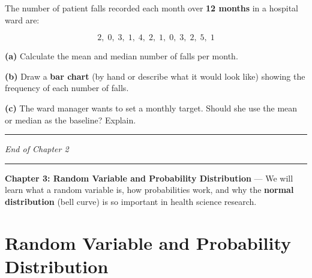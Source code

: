 \documentclass[
  12pt,
  letterpaper,
]{book}
\begin{document}
\begin{tcolorbox}[enhanced jigsaw, arc=.35mm, bottomrule=.15mm, bottomtitle=1mm, breakable, colback=white, colbacktitle=quarto-callout-caution-color!10!white, colframe=quarto-callout-caution-color-frame, coltitle=black, left=2mm, leftrule=.75mm, opacityback=0, opacitybacktitle=0.6, rightrule=.15mm, title={✏️ Exercise 3}, titlerule=0mm, toprule=.15mm, toptitle=1mm]

The number of patient falls recorded each month over \textbf{12 months}
in a hospital ward are:

\[2, \; 0, \; 3, \; 1, \; 4, \; 2, \; 1, \; 0, \; 3, \; 2, \; 5, \; 1\]

\textbf{(a)} Calculate the mean and median number of falls per month.

\textbf{(b)} Draw a \textbf{bar chart} (by hand or describe what it
would look like) showing the frequency of each number of falls.

\textbf{(c)} The ward manager wants to set a monthly target. Should she
use the mean or median as the baseline? Explain.

\end{tcolorbox}

\begin{center}\rule{0.5\linewidth}{0.5pt}\end{center}

\emph{End of Chapter 2}

\begin{center}\rule{0.5\linewidth}{0.5pt}\end{center}

\begin{tcolorbox}[enhanced jigsaw, arc=.35mm, bottomrule=.15mm, bottomtitle=1mm, breakable, colback=white, colbacktitle=quarto-callout-note-color!10!white, colframe=quarto-callout-note-color-frame, coltitle=black, left=2mm, leftrule=.75mm, opacityback=0, opacitybacktitle=0.6, rightrule=.15mm, title={📚 Coming Up Next}, titlerule=0mm, toprule=.15mm, toptitle=1mm]

\textbf{Chapter 3: Random Variable and Probability Distribution} --- We
will learn what a random variable is, how probabilities work, and why
the \textbf{normal distribution} (bell curve) is so important in health
science research.

\end{tcolorbox}


\chapter{Random Variable and Probability
Distribution}\label{random-variable-and-probability-distribution}
\end{document}
